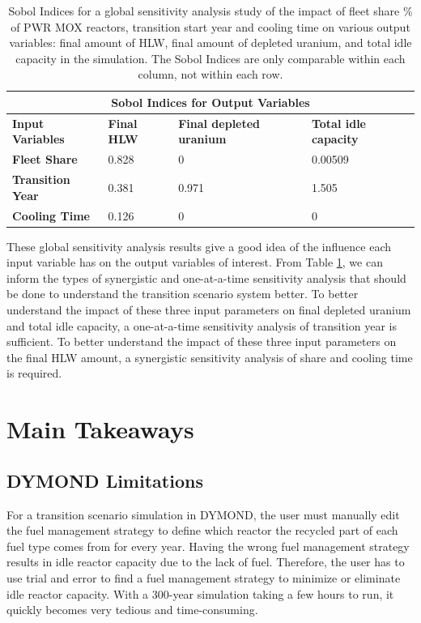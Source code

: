     \begin{table}[H]
        \centering
        \doublespacing
        \caption{Sobol Indices for a global sensitivity analysis study of the impact of 
        fleet share \% of PWR MOX reactors, transition start year and cooling time on various output
        variables: final amount of HLW, final amount of depleted uranium, and total 
        idle capacity in the simulation. The Sobol Indices are only comparable within each column, 
        not within each row.}
        \label{tab:sobol}
            \small
            \begin{tabular}{l|lll}
                \hline	
                \multicolumn{4}{c}{\textbf{Sobol Indices for Output Variables}}   \\ \hline
                \textbf{Input Variables} & \textbf{Final HLW} & \textbf{Final depleted uranium} & \textbf{Total idle capacity} \\ \hline
                \textbf{Fleet Share} & 0.828     & 0                      & 0.00509             \\
                \textbf{Transition Year}                & 0.381     & 0.971                  & 1.505               \\
                \textbf{Cooling Time}                         & 0.126     & 0                      & 0                   \\ \hline

            \end{tabular}
    \end{table}

These global sensitivity analysis results give a good idea of the influence each 
input variable has on the output variables of interest. 
From Table \ref{tab:sobol}, we can inform the types of synergistic and one-at-a-time 
sensitivity analysis that should be done 
to understand the transition scenario system better. 
To better understand the impact of these three input parameters on final depleted 
uranium and total idle capacity, a one-at-a-time sensitivity analysis of transition 
year is sufficient. 
To better understand the impact of these three input parameters on the final HLW 
amount, a synergistic sensitivity analysis of share and cooling time is required.

\section{Main Takeaways}
\subsection{DYMOND Limitations}
For a transition scenario simulation in DYMOND, the user must 
manually edit the fuel management 
strategy to define which reactor the recycled 
part of each fuel type comes from for every year. 
Having the wrong fuel management strategy results in idle reactor
capacity due to the lack of fuel. 
Therefore, the user has to use trial and error to find a fuel 
management strategy to minimize or eliminate idle reactor capacity. 
With a 300-year simulation taking a few hours to run, it quickly 
becomes very tedious and time-consuming.  

